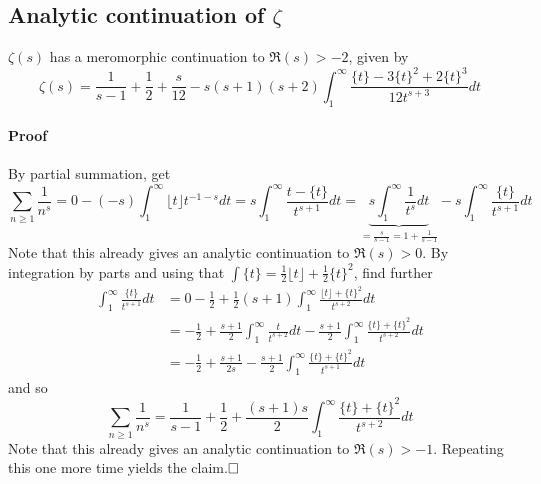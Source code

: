 \subsection{Analytic continuation of $\zeta$}
$\zeta(s)$ has a meromorphic continuation to $\Re(s) > -2$, given by
\begin{equation*}
    \zeta(s) = \frac 1 {s - 1} + \frac 1 2 + \frac s {12} - s(s + 1)(s + 2) \int_1^\infty \frac {\{t\} - 3\{t\}^2 + 2\{t\}^3} {12t^{s + 3}} dt
\end{equation*}
\paragraph{Proof} By partial summation, get
\begin{equation*}
    \sum_{n \geq 1} \frac 1 {n^s} = 0 - (-s)\int_1^\infty \lfloor t \rfloor t^{-1 - s} dt = s\int_1^\infty \frac {t - \{t\}} {t^{s + 1}} dt = \underbrace{s \int_1^\infty \frac 1 {t^s} dt}_{= \frac s {s - 1} = 1 + \frac 1 {s - 1}} - s\int_1^\infty \frac {\{t\}} {t^{s + 1}} dt
\end{equation*}
Note that this already gives an analytic continuation to $\Re(s) > 0$.
By integration by parts and using that $\int \{t\} = \frac 1 2 \lfloor t \rfloor + \frac 1 2 \{t\}^2$, find further
\begin{align*}
    \int_1^\infty \frac {\{t\}} {t^{s + 1}} dt &= 0 - \frac 1 2 + \frac 1 2(s + 1)\int_1^\infty \frac {\lfloor t \rfloor + \{t\}^2} {t^{s + 2}} dt \\
    &= -\frac 1 2 + \frac {s + 1} 2 \int_1^\infty \frac t {t^{s + 2}} dt - \frac {s + 1} 2 \int_1^\infty \frac {\{t\} + \{t\}^2} {t^{s + 2}} dt \\
    &= -\frac 1 2 + \frac {s + 1} {2s} - \frac {s + 1} 2 \int_1^\infty \frac {\{t\} + \{t\}^2} {t^{s + 1}} dt
\end{align*}
and so
\begin{equation*}
    \sum_{n \geq 1} \frac 1 {n^s} = \frac 1 {s - 1} + \frac 1 2 + \frac {(s + 1)s} 2 \int_1^\infty \frac {\{t\} + \{t\}^2} {t^{s + 2}} dt
\end{equation*}
Note that this already gives an analytic continuation to $\Re(s) > -1$.
Repeating this one more time yields the claim.$\hfill\square$

